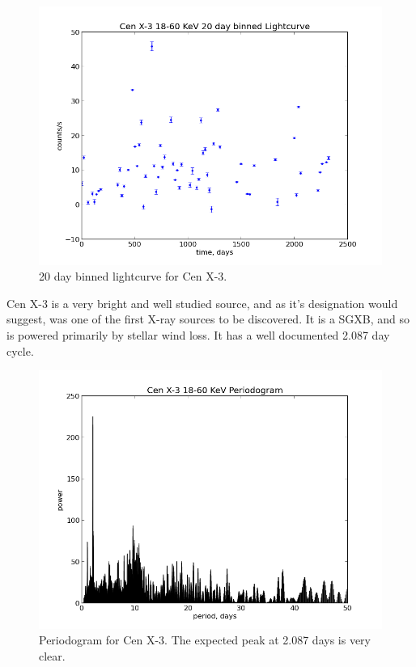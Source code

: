 \begin{figure}[h!]
\centering
\includegraphics[width=130mm]{gfx/Fig7.png}
\caption{20 day binned lightcurve for Cen X-3.}
\label{Figure 7}
\end{figure}

Cen X-3 is a very bright and well studied source, and as it\textquoteright{}s designation would suggest, was one of the first X-ray sources to be discovered. It is a SGXB, and so is powered primarily by stellar wind loss. It has a well documented 2.087 day cycle.

\begin{figure}[h!]
\centering
\includegraphics[width=130mm]{gfx/Fig8.png}
\caption{Periodogram for Cen X-3. The expected peak at 2.087 days is very clear.}
\label{Figure 8}
\end{figure}

